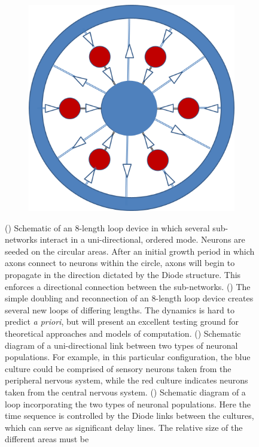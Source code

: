 \begin{figure}
\begin{center}
\begin{subfigure}[b]{0.24\linewidth}
\begin{center}
\end{center}
\end{subfigure}
\begin{subfigure}[b]{0.24\linewidth}
\begin{center}
\includegraphics[width=0.7\linewidth]{../fig/expdesign5.png}\subcaption{}\label{fig:expdesign5}
\end{center}
\end{subfigure}
\end{center}
\caption{() Schematic of an 8-length loop device in which several sub-networks interact in a uni-directional, ordered mode. Neurons are seeded on the circular areas. After an initial growth period in which axons connect to neurons within the circle, axons will begin to propagate in the direction dictated by the Diode structure. This enforces a directional connection between the sub-networks. () The simple doubling and reconnection of an 8-length loop device creates several new loops of differing lengths. The dynamics is hard to predict {\it a priori}, but will present an excellent testing ground for theoretical approaches and models of computation. () Schematic diagram of a uni-directional link between two types of neuronal populations. For example, in this particular configuration, the blue culture could be comprised of sensory neurons taken from the peripheral nervous system, while the red culture indicates neurons taken from the central nervous system. () Schematic diagram of a loop incorporating the two types of neuronal populations. Here the time sequence is controlled by the Diode links between the cultures, which can serve as significant delay lines. The relative size of the different areas must be}
\end{figure}

